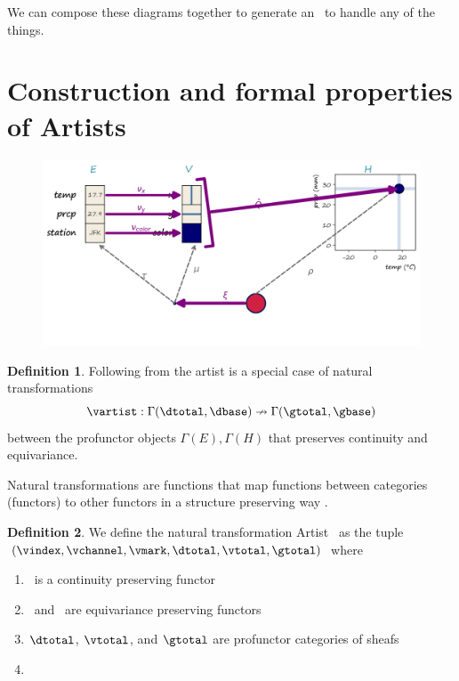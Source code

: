 \documentclass[10pt,journal,compsoc]{IEEEtran}
\theoremstyle{definition}
\newtheorem{definition}{Definition}[section]
\theoremstyle{remark}
\begin{document}
We can compose these diagrams together to generate an \vartist\ to handle any of the things. 

\section{Construction and formal properties of Artists}
\label{sec:artist:construction}
\begin{figure}[h!]
  \includegraphics[width=\linewidth]{q.png}
  \caption{}
  \label{fig:constraints:q-overall}
\end{figure}


\begin{definition} Following from \label{def:artist:} the artist \vartist is a special case of  natural transformations
  \begin{equation}
    \vartist: \Gamma(\dtotal, \dbase)\nrightarrow \Gamma(\gtotal, \gbase)
  \end{equation}
  between the profunctor objects $\Gamma(E),\Gamma(H)$ that preserves continuity and equivariance.
\end{definition}
  Natural transformations are functions that map functions between categories (functors) to other functors in a structure preserving way \cite{riehlCategoryTheoryContext, spanier1989algebraic, fongInvitationAppliedCategory2019}.

\begin{definition} We define the natural transformation \textcolor{artist}{Artist}  \vartist\ as the tuple $(\vindex, \vchannel, \vmark, \mathcal{\dtotal},\mathcal{\vtotal}, \mathcal{\gtotal})$ where
  \begin{enumerate}
    \item \vindex\ is a continuity preserving functor
    \item \vchannel\ and \vmark\ are equivariance preserving functors
    \item $\mathcal{\dtotal}$, $\mathcal{\vtotal}$, and $\mathcal{\gtotal}$ are profunctor categories of sheafs
    \item 
  \end{enumerate}
\end{definition}
\end{document}
